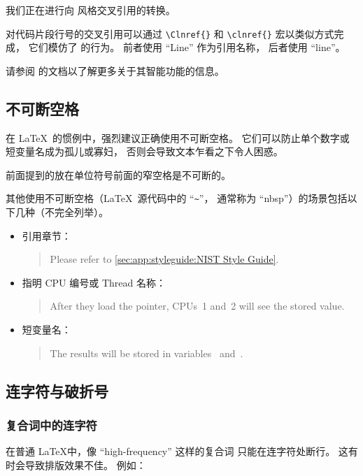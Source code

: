 我们正在进行向  风格交叉引用的转换。

对代码片段行号的交叉引用可以通过
\verb|\Clnref{}| 和 \verb|\clnref{}| 宏以类似方式完成，
它们模仿了  的行为。
前者使用 ``Line'' 作为引用名称，
后者使用 ``line''。

请参阅  的文档以了解更多关于其智能功能的信息。

\subsection{不可断空格}
\label{sec:app:styleguide:Non Breakable Spaces}

在 \LaTeX\ 的惯例中，强烈建议正确使用不可断空格。
它们可以防止单个数字或短变量名成为孤儿或寡妇，
否则会导致文本乍看之下令人困惑。

前面提到的放在单位符号前面的窄空格是不可断的。

其他使用不可断空格（\LaTeX\ 源代码中的 ``\verb|~|''，
通常称为 ``nbsp''）的场景包括以下几种（不完全列举）。

\begin{itemize}
\item 引用章节：
  \begin{quote}
    Please refer to \cref{sec:app:styleguide:NIST Style Guide}.
  \end{quote}
\item 指明 CPU 编号或 Thread 名称：
  \begin{quote}
    After they load the pointer, CPUs~1 and~2 will see the stored
    value.
  \end{quote}
\item 短变量名：
  \begin{quote}
    The results will be stored in variables~ and~.
  \end{quote}
\end{itemize}

\subsection{连字符与破折号}
\label{sec:app:styleguide:Hyphenation and Dashes}

\subsubsection{复合词中的连字符}
\label{sec:app:styleguide:Hyphenation in Compound Word}

在普通 \LaTeX 中，像 ``high-frequency'' 这样的复合词
只能在连字符处断行。
这有时会导致排版效果不佳。
例如：

